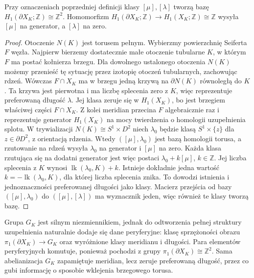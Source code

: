 \begin{stwierdzenie}
\label{thm:kt-peripheral-homology}
Przy oznaczeniach poprzedniej definicji
klasy $[\mu],[\lambda]$ tworzą bazę
$H_1(\partial X_K;\mathbb Z)\cong\mathbb Z^2$.
Homomorfizm
$H_1(\partial X_K;\mathbb Z)\to
H_1(X_K;\mathbb Z)\cong\mathbb Z$
wysyła $[\mu]$ na generator, a $[\lambda]$ na zero.
\end{stwierdzenie}

\begin{proof}
Otoczenie $N(K)$ jest torusem pełnym.
Wybierzmy powierzchnię Seiferta $F$ węzła.
Najpierw bierzemy dostatecznie małe otoczenie tubularne
$K$, w którym $F$ ma postać kołnierza brzegu.
Dla dowolnego ustalonego otoczenia $N(K)$ możemy
przenieść tę sytuację przez izotopię otoczeń tubularnych,
zachowując rdzeń. Wówczas $F\cap X_K$ ma w brzegu
jedną krzywą na $\partial N(K)$ równoległą do $K$.
Ta krzywa jest pierwotna i ma
liczbę splecenia zero z $K$, więc reprezentuje
preferowaną długość $\lambda$.
Jej klasa zeruje się w $H_1(X_K)$,
bo jest brzegiem właściwej części $F\cap X_K$.
Z kolei meridian przecina $F$ algebraicznie
raz i reprezentuje generator $H_1(X_K)$
na mocy twierdzenia o homologii
uzupełnienia splotu.
W trywializacji $N(K)\cong S^1\times D^2$
niech $\lambda_0$ będzie klasą $S^1\times\{z\}$
dla $z\in\partial D^2$, z orientacją rdzenia.
Wtedy $([\mu],\lambda_0)$ jest bazą homologii torusa,
a rzutowanie na rdzeń wysyła $\lambda_0$ na generator
i $[\mu]$ na zero. Każda klasa rzutująca się na
dodatni generator jest więc postaci
$\lambda_0+k[\mu]$, $k\in\mathbb Z$.
Jej liczba splecenia z $K$ wynosi
$\operatorname{lk}(\lambda_0,K)+k$.
Istnieje dokładnie jedna wartość
$k=-\operatorname{lk}(\lambda_0,K)$, dla której
liczba splecenia znika. To dowodzi istnienia
i jednoznaczności preferowanej długości jako klasy.
Macierz przejścia od bazy $([\mu],\lambda_0)$
do $([\mu],[\lambda])$ ma wyznacznik jeden,
więc również te klasy tworzą bazę.
\end{proof}

\begin{uwaga}
Grupa $G_K$ jest silnym niezmiennikiem, jednak
do odtworzenia pełnej struktury uzupełnienia
naturalnie dodaje się dane peryferyjne:
klasę sprzężoności obrazu
$\pi_1(\partial X_K)\to G_K$
oraz wyróżnione klasy meridianu i długości.
Para elementów peryferyjnych komutuje,
ponieważ pochodzi z grupy
$\pi_1(\partial X_K)\cong\mathbb Z^2$.
Sama abelianizacja $G_K$ zapamiętuje meridian,
lecz zeruje preferowaną długość, przez co
gubi informację o sposobie wklejenia
brzegowego torusa.
\end{uwaga}

